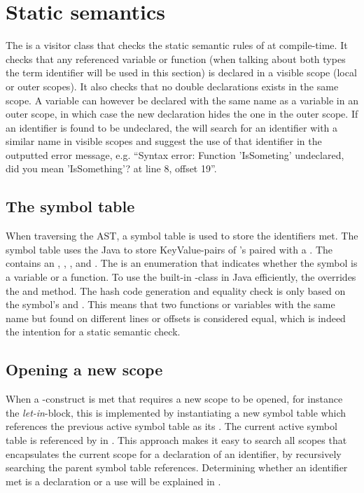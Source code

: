 \section{Static semantics}
The  is a visitor class that checks the static semantic rules of \productname{} at compile-time. It checks that any referenced variable or function (when talking about both types the term identifier will be used in this section) is declared in a visible scope (local or outer scopes). It also checks that no double declarations exists in the same scope. A variable can however be declared with the same name as a variable in an outer scope, in which case the new declaration hides the one in the outer scope. If an identifier is found to be undeclared, the  will search for an identifier with a similar name in visible scopes and suggest the use of that identifier in the outputted error message, e.g. ``Syntax error: Function 'IsSometing' undeclared, did you mean 'IsSomething'? at line 8, offset 19''.

\subsection{The symbol table}
When traversing the AST, a symbol table is used to store the identifiers met. The symbol table uses the Java  to store KeyValue-pairs of  's paired with a . The  contains an  ,  ,  , and  . The   is an enumeration that indicates whether the symbol is a variable or a function. To use the built-in -class in Java efficiently, the  overrides the  and  method. The hash code generation and equality check is only based on the symbol's  and . This means that two functions or variables with the same name but found on different lines or offsets is considered   equal, which is indeed the intention for a static semantic check.

\subsection{Opening a new scope}
When a \productname{}-construct is met that requires a new scope to be opened, for instance the \emph{let-in}-block, this is implemented by instantiating a new symbol table which references the previous active symbol table as its  . The current active symbol table is referenced by   in . This approach makes it easy to search all scopes that encapsulates the current scope for a declaration of an identifier, by recursively searching the parent symbol table references. Determining whether an identifier met is a declaration or a use will be explained in .

